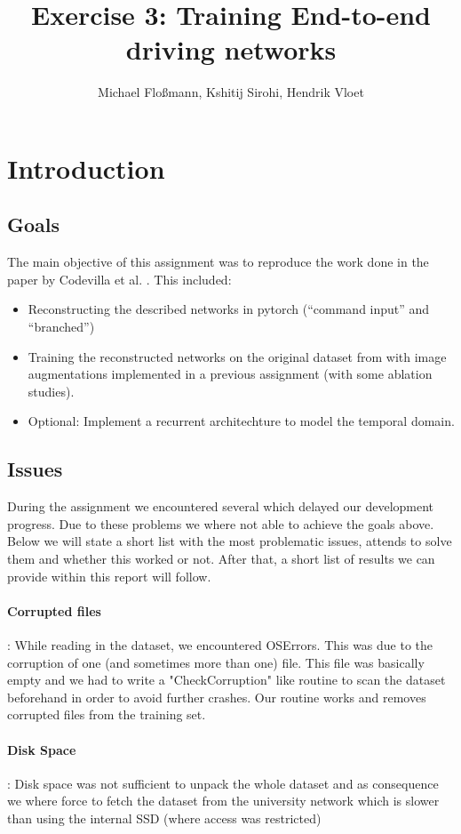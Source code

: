 \documentclass[a4paper]{article}
\title{Exercise 3: Training End-to-end driving networks}
\author{Michael Floßmann, Kshitij Sirohi, Hendrik Vloet}
\begin{document}
\maketitle

\section{Introduction}
\subsection{Goals}
The main objective of this assignment was to reproduce the work done in the
paper by Codevilla et al. \cite{imitation}. This included:
\begin{itemize}
\item Reconstructing the described networks in pytorch (``command input'' and ``branched'')
\item Training the reconstructed networks on the original dataset from
  \cite{imitation} with image augmentations implemented in a previous
  assignment (with some ablation studies).
\item Optional: Implement a recurrent architechture to model the temporal domain.
\end{itemize} 

\subsection{Issues}

During the assignment we encountered several which delayed our development progress. Due to these problems we where not able to achieve the goals above. Below we will state a short list with the most problematic issues, attends to solve them and whether this worked or not. After that, a short list of results we can provide within this report will follow.

	\paragraph{Corrupted files}: While reading in the dataset, we encountered OSErrors. This was due to the corruption of one (and sometimes more than one) file. This file was basically empty and we had to write a "CheckCorruption" like routine to scan the dataset beforehand in order to avoid further crashes. Our routine works and removes corrupted files from the training set.
	\paragraph{Disk Space}: Disk space was not sufficient to unpack the whole dataset and as consequence we where force to fetch the dataset from the university network which is slower than using the internal SSD (where access was restricted)
\end{document}
